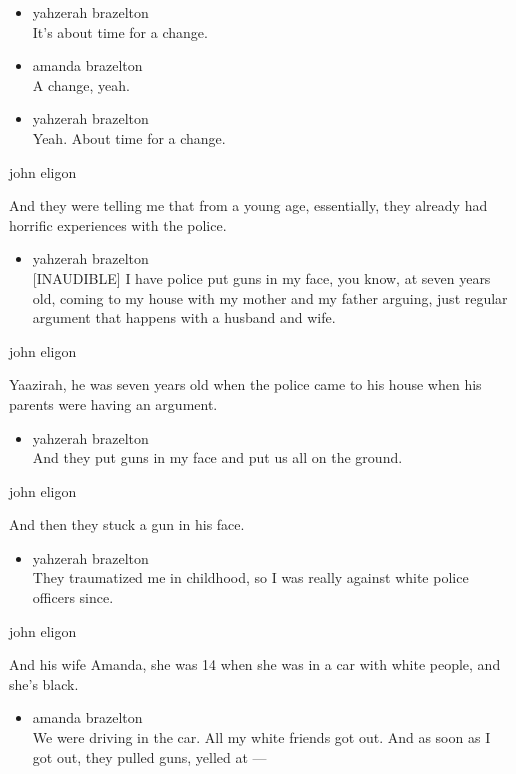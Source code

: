 \begin{itemize}
\item
  yahzerah brazelton\\
  It's about time for a change.
\item
  amanda brazelton\\
  A change, yeah.
\item
  yahzerah brazelton\\
  Yeah. About time for a change.
\end{itemize}

john eligon

And they were telling me that from a young age, essentially, they
already had horrific experiences with the police.

\begin{itemize}
\tightlist
\item
  yahzerah brazelton\\
  {[}INAUDIBLE{]} I have police put guns in my face, you know, at seven
  years old, coming to my house with my mother and my father arguing,
  just regular argument that happens with a husband and wife.
\end{itemize}

john eligon

Yaazirah, he was seven years old when the police came to his house when
his parents were having an argument.

\begin{itemize}
\tightlist
\item
  yahzerah brazelton\\
  And they put guns in my face and put us all on the ground.
\end{itemize}

john eligon

And then they stuck a gun in his face.

\begin{itemize}
\tightlist
\item
  yahzerah brazelton\\
  They traumatized me in childhood, so I was really against white police
  officers since.
\end{itemize}

john eligon

And his wife Amanda, she was 14 when she was in a car with white people,
and she's black.

\begin{itemize}
\tightlist
\item
  amanda brazelton\\
  We were driving in the car. All my white friends got out. And as soon
  as I got out, they pulled guns, yelled at ---
\end{itemize}

